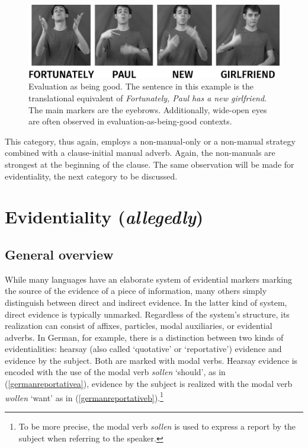 \begin{figure}[bt]
\centering
	\includegraphics[width=1.0\textwidth]{evalgoodnewsw.jpg}
	\caption{Evaluation as being good. The sentence in this example is the translational equivalent of \textit{Fortunately, Paul has a new girlfriend}. The main markers are the eyebrows. Additionally, wide-open eyes are often observed in evaluation-as-being-good contexts.}
	\label{fig:evalgooda}
\end{figure}

This category, thus again, employs a non-manual-only or a non-manual strategy combined with a clause-initial manual adverb. Again, the non-manuals are strongest at the beginning of the clause. The same observation will be made for evidentiality, the next category to be discussed.

\section{Evidentiality (\textit{allegedly})}\label{evidentiality}


\subsection{General overview}

While many languages have an elaborate system of evidential markers marking the source of the evidence of a piece of information, many others simply distinguish between direct and indirect evidence. In the latter kind of system, direct evidence is typically unmarked. Regardless of the system's structure, its realization can consist of affixes, particles, modal auxiliaries, or evidential adverbs. In German, for example, there is a distinction between two kinds of evidentialities: hearsay (also called `quotative' or `reportative') evidence and evidence by the subject. Both are marked with modal verbs. Hearsay evidence is encoded with the use of the modal verb \textit{sollen} `should', as in (\ref{germanreportativea}), evidence by the subject is realized with the modal verb \textit{wollen} `want' as in (\ref{germanreportativeb}).\footnote{ To be more precise, the modal verb \textit{sollen} is used to express a report by the subject when referring to the speaker. }

